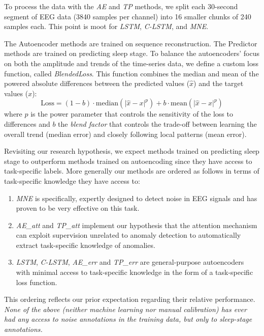 \documentclass[runningheads]{llncs}
\begin{document}
To process the data with the \emph{AE} and \emph{TP} methods, we split
each 30-second segment of EEG data (3840 samples per channel) into 16
smaller chunks of 240 samples each. This point is moot for \emph{LSTM},
\emph{C-LSTM}, and \emph{MNE}.

The Autoencoder methods are trained on sequence reconstruction. The
Predictor methods are trained on predicting sleep stage.
%
To balance the autoencoders' focus on both the amplitude and trends of the
time-series data, we define a custom loss function, called
\emph{BlendedLoss}. This function combines the median and mean of the
powered absolute differences between the predicted values ($\hat{x}$)
and the target values ($x$):
%
$$
\text{Loss} =
  (1 - b)\cdot\mathrm{median}(\lvert \hat{x} - x \rvert^p) +
  b\cdot\mathrm{mean}(\lvert \hat{x} - x \rvert^p)
$$
%
where $p$ is the power parameter that controls the sensitivity of the
loss to differences and $b$ the \emph{blend factor} that controls
the trade-off between learning the overall trend (median error) and
closely following local patterns (mean error).

Revisiting our research hypothesis, we expect methods trained on
predicting sleep stage to outperform methods trained on autoencoding
since they have access to task-specific labels. More generally our
methods are ordered as follows in terms of task-specific knowledge
they have access to:
%
\begin{enumerate}
\item \emph{MNE} is specifically, expertly designed to detect noise in
  EEG signals and has proven to be very effective on this task.
\item \emph{AE\_att} and \emph{TP\_att} implement our hypothesis that
  the attention mechanism can exploit supervision unrelated to anomaly
  detection to automatically extract task-specific knowledge of
  anomalies.
\item \emph{LSTM}, \emph{C-LSTM}, \emph{AE\_err} and \emph{TP\_err}
  are general-purpose autoencoders with minimal access to task-specific
  knowledge in the form of a task-specific loss function.
\end{enumerate}
%
This ordering reflects our prior expectation regarding their relative
performance. \emph{None of the above (neither machine learning nor
manual calibration) has ever had any access to noise annotations
in the training data, but only to sleep-stage annotations.}
\end{document}
